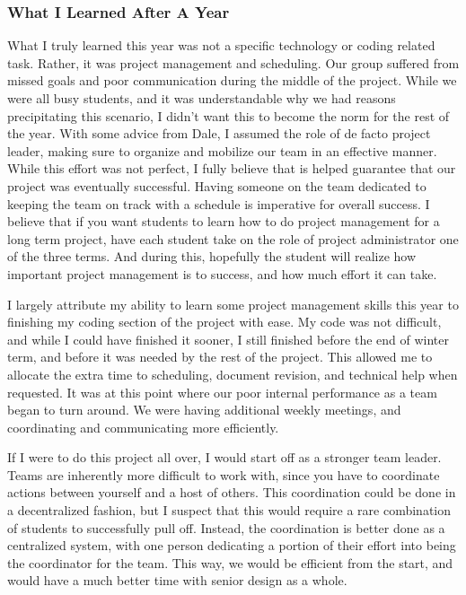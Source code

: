 \subsubsection{What I Learned After A Year}
What I truly learned this year was not a specific technology or coding related task. Rather, it was project management and scheduling. Our group suffered from missed goals and poor communication during the middle of the project. While we were all busy students, and it was understandable why we had reasons precipitating this scenario, I didn't want this to become the norm for the rest of the year. With some advice from Dale, I assumed the role of de facto project leader, making sure to organize and mobilize our team in an effective manner. While this effort was not perfect, I fully believe that is helped guarantee that our project was eventually successful. Having someone on the team dedicated to keeping the team on track with a schedule is imperative for overall success. I believe that if you want students to learn how to do project management for a long term project, have each student take on the role of project administrator one of the three terms. And during this, hopefully the student will realize how important project management is to success, and how much effort it can take. 

I largely attribute my ability to learn some project management skills this year to finishing my coding section of the project with ease. My code was not difficult, and while I could have finished it sooner, I still finished before the end of winter term, and before it was needed by the rest of the project. This allowed me to allocate the extra time to scheduling, document revision, and technical help when requested. It was at this point where  our poor internal performance as a team began to turn around. We were having additional weekly meetings, and coordinating and communicating more efficiently. 

If I were to do this project all over, I would start off as a stronger team leader. Teams are inherently more difficult to work with, since you have to coordinate actions between yourself and a host of others. This coordination could be done in a decentralized fashion, but I suspect that this would require a rare combination of students to successfully pull off. Instead, the coordination is better done as a centralized system, with one person dedicating a portion of their effort into being the coordinator for the team. This way, we would be efficient from the start, and would have a much better time with senior design as a whole.
